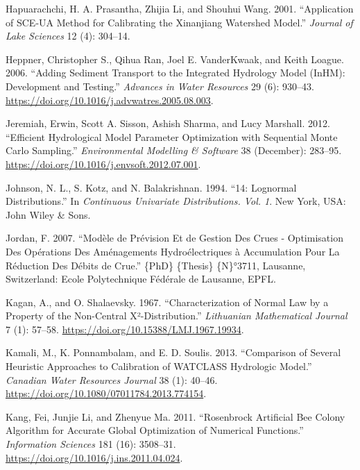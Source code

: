 \documentclass[
  letterpaper,
  DIV=11,
  numbers=noendperiod]{scrreprt}
\newlength{\cslhangindent}
\newlength{\cslentryspacingunit} %
\newenvironment{CSLReferences}[2] %
 {%
  \setlength{\parindent}{0pt}
  \ifodd #1
  \let\oldpar\par
  \def\par{\hangindent=\cslhangindent\oldpar}
  \fi
  \setlength{\parskip}{#2\cslentryspacingunit}
 }%
 {}
\begin{document}
\begin{CSLReferences}{1}{0}
\leavevmode{}%
Hapuarachchi, H. A. Prasantha, Zhijia Li, and Shouhui Wang. 2001.
{``Application of {SCE}-{UA} {Method} for {Calibrating} the {Xinanjiang}
{Watershed} {Model}.''} \emph{Journal of Lake Sciences} 12 (4): 304--14.

\leavevmode{}%
Heppner, Christopher S., Qihua Ran, Joel E. VanderKwaak, and Keith
Loague. 2006. {``Adding Sediment Transport to the Integrated Hydrology
Model ({InHM}): {Development} and Testing.''} \emph{Advances in Water
Resources} 29 (6): 930--43.
\url{https://doi.org/10.1016/j.advwatres.2005.08.003}.

\leavevmode{}%
Jeremiah, Erwin, Scott A. Sisson, Ashish Sharma, and Lucy Marshall.
2012. {``Efficient Hydrological Model Parameter Optimization with
{Sequential} {Monte} {Carlo} Sampling.''} \emph{Environmental Modelling
\& Software} 38 (December): 283--95.
\url{https://doi.org/10.1016/j.envsoft.2012.07.001}.

\leavevmode{}%
Johnson, N. L., S. Kotz, and N. Balakrishnan. 1994. {``14: {Lognormal}
{Distributions}.''} In \emph{Continuous Univariate Distributions. {Vol}.
1}. New York, USA: John Wiley \& Sons.

\leavevmode{}%
Jordan, F. 2007. {``Modèle de Prévision Et de Gestion Des Crues -
Optimisation Des Opérations Des Aménagements Hydroélectriques à
Accumulation Pour La Réduction Des Débits de Crue.''} \{PhD\} \{Thesis\}
\{N\}°3711, Lausanne, Switzerland: Ecole Polytechnique Fédérale de
Lausanne, EPFL.

\leavevmode{}%
Kagan, A., and O. Shalaevsky. 1967. {``Characterization of Normal Law by
a Property of the Non-Central Χ²-Distribution.''} \emph{Lithuanian
Mathematical Journal} 7 (1): 57--58.
\url{https://doi.org/10.15388/LMJ.1967.19934}.

\leavevmode{}%
Kamali, M., K. Ponnambalam, and E. D. Soulis. 2013. {``Comparison of
Several Heuristic Approaches to Calibration of {WATCLASS} Hydrologic
Model.''} \emph{Canadian Water Resources Journal} 38 (1): 40--46.
\url{https://doi.org/10.1080/07011784.2013.774154}.

\leavevmode{}%
Kang, Fei, Junjie Li, and Zhenyue Ma. 2011. {``Rosenbrock Artificial Bee
Colony Algorithm for Accurate Global Optimization of Numerical
Functions.''} \emph{Information Sciences} 181 (16): 3508--31.
\url{https://doi.org/10.1016/j.ins.2011.04.024}.


\end{CSLReferences}
\end{document}
